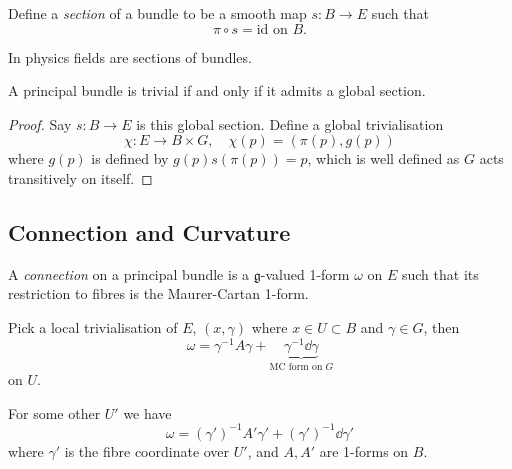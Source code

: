 \documentclass[a4paper,11pt]{article}
\begin{document}
    \begin{defi}[Section]
        Define a \emph{section} of a bundle to be a smooth map $s : B \to E$ such that 
        \begin{equation}
            \pi \circ s = \text{id on } B.
        \end{equation}

        In physics fields are sections of bundles.
    \end{defi}

    \begin{prop}
        A principal bundle is trivial if and only if it admits a global section.
    \end{prop}
    \begin{proof}
        Say $s : B \to E$ is this global section. Define a global trivialisation 
        \begin{equation}
            \chi : E \to B \times G, \quad \chi(p) = (\pi(p), g(p))
        \end{equation}
        where $g(p)$ is defined by $g(p) s(\pi(p)) = p$, which is well defined as $G$ acts transitively on itself. 
    \end{proof}

    \subsection{Connection and Curvature}
    \begin{defi}[Connection]
        A \emph{connection} on a principal bundle is a $\mathfrak{g}$-valued 1-form $\omega$ on $E$ such that its restriction to fibres is the Maurer-Cartan 1-form. 
    \end{defi}

    Pick a local trivialisation of $E$, $(x, \gamma)$ where $x \in U \subset B$ and $\gamma \in G$, then 
    \begin{equation}
        \omega = \gamma^{-1} A \gamma + \underbrace{\gamma^{-1} \dd{\gamma}}_{\text{MC form on }G} \label{eq:connection on E}
    \end{equation}
    on $U$.
    
    For some other $U'$ we have 
    \begin{equation}
        \omega = (\gamma')^{-1} A' \gamma' + (\gamma')^{-1} \dd{\gamma'}
    \end{equation}
    where $\gamma'$ is the fibre coordinate over $U'$, and $A,A'$ are 1-forms on $B$.
    
\end{document}
